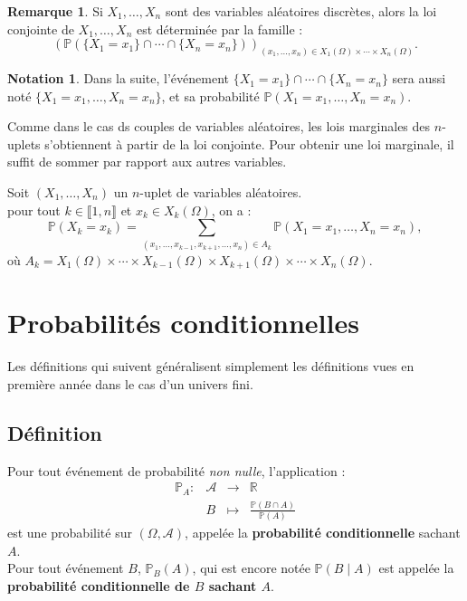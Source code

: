 \documentclass[french]{article}
\renewcommand{\P}{\mathbb{P}}
\newcommand{\R}{\mathbb{R}}
\theoremstyle{plain}
\theoremstyle{definition}
\newtheorem*{rmq}{Remarque}
\newtheorem*{notation}{Notation}
\theoremstyle{remark}
\begin{document}
\begin{rmq}
	Si $X_1,\ldots,X_n$ sont des variables aléatoires discrètes, alors la loi conjointe de $X_1,\ldots,X_n$ est déterminée par la famille :
	$$\left(\P(\{X_1=x_1\}\cap\cdots\cap\{X_n=x_n\})\right)_{(x_1,\ldots,x_n)\in X_1(\Omega)\times\cdots\times X_n(\Omega)}.$$
\end{rmq}

\begin{notation}
	Dans la suite, l'événement $\{X_1=x_1\}\cap\cdots\cap\{X_n=x_n\}$ sera aussi noté $\{X_1=x_1,\ldots,X_n=x_n\}$, et sa probabilité $\P(X_1=x_1,\ldots,X_n=x_n)$.
\end{notation}

Comme dans le cas ds couples de variables aléatoires, les lois marginales des $n$-uplets s'obtiennent à partir de la loi conjointe. Pour obtenir une loi marginale, il suffit de sommer par rapport aux autres variables.

\begin{thm}{}%
	Soit $(X_1,\ldots,X_n)$ un $n$-uplet de variables aléatoires.\\
	pour tout $k\in\llbracket1,n\rrbracket$ et $x_k\in X_k(\Omega)$, on a :
	$$\P(X_k=x_k)=\sum_{(x_1,\ldots,x_{k-1},x_{k+1},\ldots,x_n)\in A_k}\P(X_1=x_1,\ldots,X_n=x_n),$$ où $A_k=X_1(\Omega)\times\cdots\times X_{k-1}(\Omega)\times X_{k+1}(\Omega)\times\cdots\times X_n(\Omega)$.
\end{thm}

\section{Probabilités conditionnelles}

Les définitions qui suivent généralisent simplement les définitions vues en première année dans le cas d'un univers fini.

\subsection{Définition}

\begin{thm}{}%
	Pour tout événement de probabilité \textit{non nulle}, l'application :
	$$\begin{array}{lrcl}
		\P_A:&\mathcal{A}&\longrightarrow&\R\\
		&B&\longmapsto&\displaystyle\frac{\P(B\cap A)}{\P(A)}
	\end{array}$$ est une probabilité sur $(\Omega,\mathcal{A})$, appelée la \textbf{probabilité conditionnelle} sachant $A$.\\
	 Pour tout événement $B$, $\P_B(A)$, qui est encore notée $\P(B\mid A)$ est appelée la \textbf{probabilité conditionnelle de $B$ sachant $A$}.
\end{thm}
\end{document}
